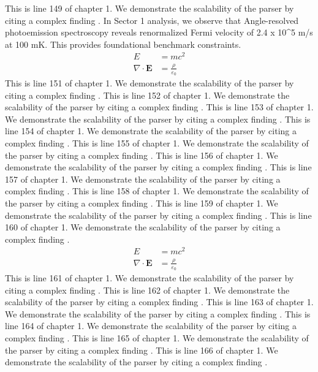 This is line 149 of chapter 1. We demonstrate the scalability of the parser by citing a complex finding \cite{ref1_149}.
In Sector 1 analysis, we observe that Angle-resolved photoemission spectroscopy reveals renormalized Fermi velocity of 2.4 x 10^5 m/s at 100 mK. This provides foundational benchmark constraints.
\begin{align*}
  E &= mc^2 \\
  \nabla \cdot \mathbf{E} &= \frac{\rho}{\varepsilon_0}
\end{align*}
This is line 151 of chapter 1. We demonstrate the scalability of the parser by citing a complex finding \cite{ref1_151}.
This is line 152 of chapter 1. We demonstrate the scalability of the parser by citing a complex finding \cite{ref1_152}.
This is line 153 of chapter 1. We demonstrate the scalability of the parser by citing a complex finding \cite{ref1_153}.
This is line 154 of chapter 1. We demonstrate the scalability of the parser by citing a complex finding \cite{ref1_154}.
This is line 155 of chapter 1. We demonstrate the scalability of the parser by citing a complex finding \cite{ref1_155}.
This is line 156 of chapter 1. We demonstrate the scalability of the parser by citing a complex finding \cite{ref1_156}.
This is line 157 of chapter 1. We demonstrate the scalability of the parser by citing a complex finding \cite{ref1_157}.
This is line 158 of chapter 1. We demonstrate the scalability of the parser by citing a complex finding \cite{ref1_158}.
This is line 159 of chapter 1. We demonstrate the scalability of the parser by citing a complex finding \cite{ref1_159}.
This is line 160 of chapter 1. We demonstrate the scalability of the parser by citing a complex finding \cite{ref1_160}.
\begin{align*}
  E &= mc^2 \\
  \nabla \cdot \mathbf{E} &= \frac{\rho}{\varepsilon_0}
\end{align*}
This is line 161 of chapter 1. We demonstrate the scalability of the parser by citing a complex finding \cite{ref1_161}.
This is line 162 of chapter 1. We demonstrate the scalability of the parser by citing a complex finding \cite{ref1_162}.
This is line 163 of chapter 1. We demonstrate the scalability of the parser by citing a complex finding \cite{ref1_163}.
This is line 164 of chapter 1. We demonstrate the scalability of the parser by citing a complex finding \cite{ref1_164}.
This is line 165 of chapter 1. We demonstrate the scalability of the parser by citing a complex finding \cite{ref1_165}.
This is line 166 of chapter 1. We demonstrate the scalability of the parser by citing a complex finding \cite{ref1_166}.
